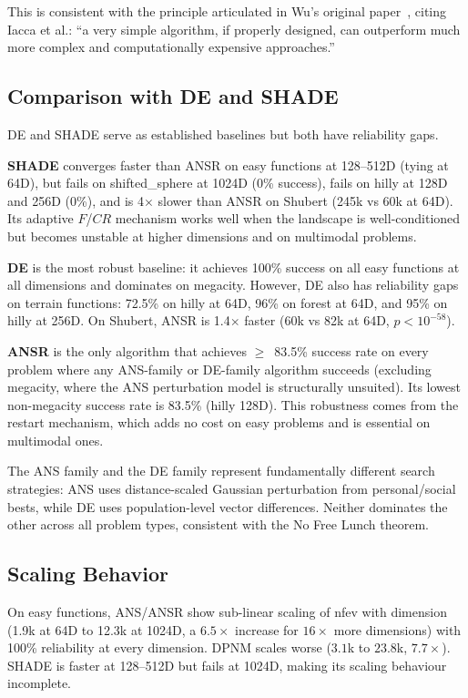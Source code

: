 \documentclass[11pt,a4paper]{article}
\begin{document}
This is consistent with the principle articulated in Wu's original paper~\cite{wu2015ans}, citing Iacca et al.: ``a very simple algorithm, if properly designed, can outperform much more complex and computationally expensive approaches.''

\subsection{Comparison with DE and SHADE}

DE and SHADE serve as established baselines but both have reliability gaps.

\textbf{SHADE} converges faster than ANSR on easy functions at 128--512D (tying at 64D), but fails on shifted\_sphere at 1024D (0\% success), fails on hilly at 128D and 256D (0\%), and is 4$\times$ slower than ANSR on Shubert (245k vs 60k at 64D). Its adaptive $F$/$CR$ mechanism works well when the landscape is well-conditioned but becomes unstable at higher dimensions and on multimodal problems.

\textbf{DE} is the most robust baseline: it achieves 100\% success on all easy functions at all dimensions and dominates on megacity. However, DE also has reliability gaps on terrain functions: 72.5\% on hilly at 64D, 96\% on forest at 64D, and 95\% on hilly at 256D. On Shubert, ANSR is 1.4$\times$ faster (60k vs 82k at 64D, $p < 10^{-58}$).

\textbf{ANSR} is the only algorithm that achieves $\geq$~83.5\% success rate on every problem where any ANS-family or DE-family algorithm succeeds (excluding megacity, where the ANS perturbation model is structurally unsuited). Its lowest non-megacity success rate is 83.5\% (hilly 128D). This robustness comes from the restart mechanism, which adds no cost on easy problems and is essential on multimodal ones.

The ANS family and the DE family represent fundamentally different search strategies: ANS uses distance-scaled Gaussian perturbation from personal/social bests, while DE uses population-level vector differences. Neither dominates the other across all problem types, consistent with the No Free Lunch theorem.

\subsection{Scaling Behavior}

On easy functions, ANS/ANSR show sub-linear scaling of nfev with dimension (1.9k at 64D to 12.3k at 1024D, a $6.5\times$ increase for $16\times$ more dimensions) with 100\% reliability at every dimension. DPNM scales worse ($3.1$k to $23.8$k, $7.7\times$). SHADE is faster at 128--512D but fails at 1024D, making its scaling behaviour incomplete.
\end{document}
